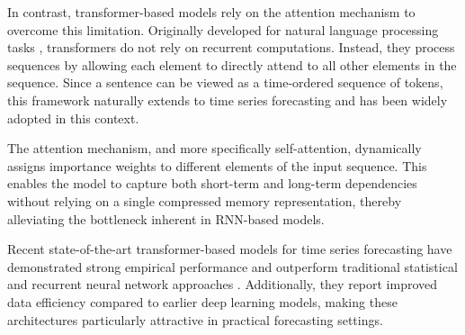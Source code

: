 \par
In contrast, transformer-based models rely on the attention mechanism to overcome this limitation. Originally developed for natural language processing tasks \cite{Vaswani2017-jv}, transformers do not rely on recurrent computations. Instead, they process sequences by allowing each element to directly attend to all other elements in the sequence. Since a sentence can be viewed as a time-ordered sequence of tokens, this framework naturally extends to time series forecasting and has been widely adopted in this context.

\par
The attention mechanism, and more specifically self-attention, dynamically assigns importance weights to different elements of the input sequence. This enables the model to capture both short-term and long-term dependencies without relying on a single compressed memory representation, thereby alleviating the bottleneck inherent in RNN-based models.

\par
Recent state-of-the-art transformer-based models for time series forecasting have demonstrated strong empirical performance and outperform traditional statistical and recurrent neural network approaches \cite{Zerveas2021-ff}. Additionally, they report improved data efficiency compared to earlier deep learning models, making these architectures particularly attractive in practical forecasting settings.
